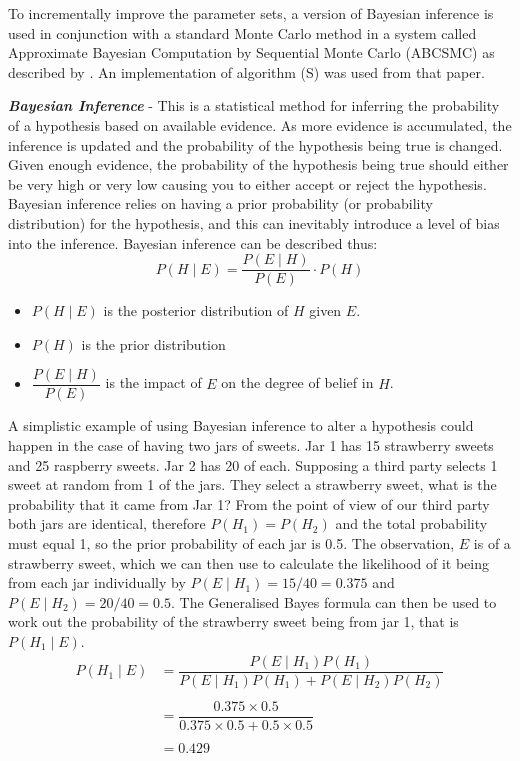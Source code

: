 To incrementally improve the parameter sets, a version of Bayesian inference is used in conjunction with a standard Monte Carlo method in a system called Approximate Bayesian Computation by Sequential Monte Carlo (ABCSMC) as described by \citet{Toni2009}. An implementation of algorithm (S) was used from that paper.

\textbf{\textit{Bayesian Inference}} - This is a statistical method for inferring the probability of a hypothesis based on available evidence. As more evidence is accumulated, the inference is updated and the probability of the hypothesis being true is changed. Given enough evidence, the probability of the hypothesis being true should either be very high or very low causing you to either accept or reject the hypothesis. Bayesian inference relies on having a prior probability (or probability distribution) for the hypothesis, and this can inevitably introduce a level of bias into the inference.
Bayesian inference can be described thus:
\begin{equation}
P(H\mid E) = \dfrac{P(E\mid H)}{P(E)}\cdot P(H)
\label{eq:bayes}
\end{equation}
\begin{itemize}
	\item $P(H\mid E)$ is the posterior distribution of $H$ given $E$.
	\item $P(H)$ is the prior distribution
	\item $\dfrac{P(E\mid H)}{P(E)}$ is the impact of $E$ on the degree of belief in $H$.
\end{itemize}

A simplistic example of using Bayesian inference to alter a hypothesis could happen in the case of having two jars of sweets. Jar 1 has 15 strawberry sweets and 25 raspberry sweets. Jar 2 has 20 of each. Supposing a third party selects 1 sweet at random from 1 of the jars. They select a strawberry sweet, what is the probability that it came from Jar 1? From the point of view of our third party both jars are identical, therefore $P(H_1) = P(H_2)$ and the total probability must equal 1, so the prior probability of each jar is 0.5. The observation, $E$ is of a strawberry sweet, which we can then use to calculate the likelihood of it being from each jar individually by $P(E\mid H_1) = 15/40 = 0.375$ and $P(E\mid H_2) = 20/40 = 0.5$.
The Generalised Bayes formula can then be used to work out the probability of the strawberry sweet being from jar 1, that is $P(H_1\mid E)$.\\
\begin{align}
\nonumber
P(H_1\mid E) & = \dfrac{P(E\mid H_1)P(H_1)}{P(E\mid H_1)P(H_1) + P(E\mid H_2)P(H_2)}\\
\nonumber \\
\nonumber
& = \dfrac{0.375 \times 0.5}{0.375 \times 0.5 + 0.5 \times 0.5}\\
\nonumber \\
& = 0.429
\end{align}

